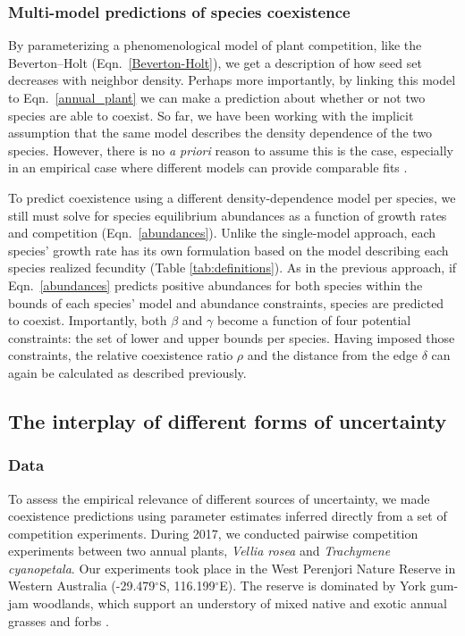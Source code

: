\subsubsection*{Multi-model predictions of species coexistence}

By parameterizing a phenomenological model of plant competition, like the Beverton--Holt (Eqn.~\ref{Beverton-Holt}), we get a description of how seed set decreases with neighbor density. Perhaps more importantly, by linking this model to  Eqn.~\ref{annual_plant} we can make a prediction about whether or not two species are able to coexist. So far, we have been working with the implicit assumption that the same model describes the density dependence of the two species. However, there is no \textit{a priori} reason to assume this is the case, especially in an empirical case where different models can provide comparable fits \citep{hart2018quantify}.


To predict coexistence using a different density-dependence model per species, we still must solve for species equilibrium abundances as a function of growth rates and competition (Eqn.~\ref{abundances}). Unlike the single-model approach, each species' growth rate has its own formulation based on the model describing each species realized fecundity (Table \ref{tab:definitions}). As in the previous approach, if Eqn.~\ref{abundances} predicts positive abundances for both species within the bounds of each species' model and abundance constraints, species are predicted to coexist. Importantly, both $\beta$ and $\gamma$ become a function of four potential constraints: the set of lower and upper bounds per species. Having imposed those constraints, the relative coexistence ratio $\rho$ and the distance from the edge $\delta$ can again be calculated as described previously.


\subsection*{The interplay of different forms of uncertainty}

\subsubsection*{Data}

To assess the empirical relevance of different sources of uncertainty, we made coexistence predictions using parameter estimates inferred directly from a set of competition experiments. During 2017, we conducted pairwise competition experiments between two annual plants, \textit{Vellia rosea} and \textit{Trachymene cyanopetala}. Our experiments took place in the West Perenjori Nature Reserve in Western Australia (-29.479$^{\circ}$S, 116.199$^{\circ}$E). The reserve is dominated by York gum-jam woodlands, which support an understory of mixed native and exotic annual grasses and forbs \citep{dwyer2015climate}.

